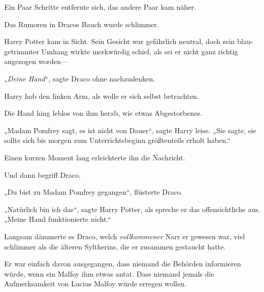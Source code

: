 Ein Paar Schritte entfernte sich, das andere Paar kam näher.

Das Rumoren in Dracos Bauch wurde schlimmer.

Harry Potter kam in Sicht. Sein Gesicht war gefährlich neutral, doch sein blau-getrimmter Umhang wirkte merkwürdig schief, als sei er nicht ganz richtig angezogen worden—

„\emph{Deine Hand}“, sagte Draco ohne nachzudenken.

Harry hob den linken Arm, als wolle er sich selbst betrachten.

Die Hand hing leblos von ihm herab, wie etwas Abgestorbenes.

„Madam Pomfrey sagt, es ist nicht von Dauer“, sagte Harry leise. „Sie sagte, sie sollte sich bis morgen zum Unterrichtsbeginn größtenteils erholt haben.“

Einen kurzen Moment lang erleichterte ihn die Nachricht.

Und dann begriff Draco.

„Du bist zu Madam Pomfrey gegangen“, flüsterte Draco.

„Natürlich bin ich das“, sagte Harry Potter, als spreche er das offensichtliche aus. „Meine Hand funktionierte nicht.“

Langsam dämmerte es Draco, welch \emph{vollkommener} Narr er gewesen war, viel schlimmer als die älteren Syltherins, die er zusammen gestaucht hatte.

Er war einfach davon ausgegangen, dass niemand die Behörden informieren würde, wenn ein Malfoy ihm etwas antat. Dass niemand jemals die Aufmerksamkeit von Lucius Malfoy würde erregen wollen.

